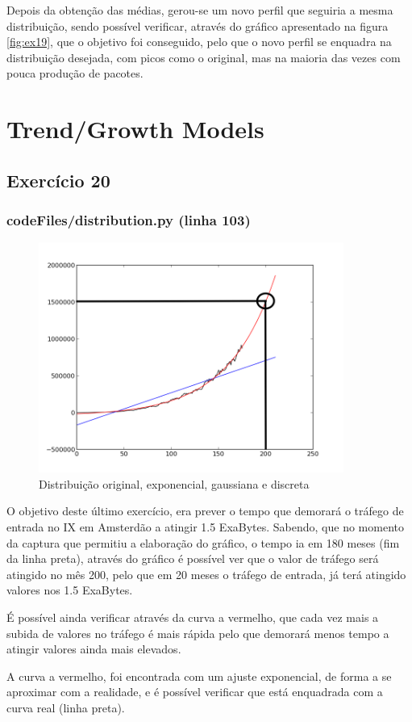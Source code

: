 \documentclass[pdftex,12pt,a4paper]{report}
\begin{document}
Depois da obtenção das médias, gerou-se um novo perfil que seguiria a mesma distribuição, sendo possível verificar, através do gráfico apresentado na figura \ref{fig:ex19}, que o objetivo foi conseguido, pelo que o novo perfil se enquadra na distribuição desejada, com picos como o original, mas na maioria das vezes com pouca produção de pacotes.

\newpage
\section{Trend/Growth Models}
\subsection{Exercício 20}
\subsubsection{codeFiles/distribution.py (linha 103)}

\begin{figure}[!htb]
\center
 \includegraphics[width=100mm,scale=1]{distribution/ex20.png}
 \caption{Distribuição original, exponencial, gaussiana e discreta}
 \label{fig:ex18}
\end{figure}

O objetivo deste último exercício, era prever o tempo que demorará o tráfego de entrada no IX em Amsterdão a atingir 1.5 ExaBytes.
Sabendo, que no momento da captura que permitiu a elaboração do gráfico, o tempo ia em 180 meses (fim da linha preta), através do gráfico é possível ver que o valor de tráfego será atingido no mês 200, pelo que em 20 meses o tráfego de entrada, já terá atingido valores nos 1.5 ExaBytes.

É possível ainda verificar através da curva a vermelho, que cada vez mais a subida de valores no tráfego é mais rápida pelo que demorará menos tempo a atingir valores ainda mais elevados.

A curva a vermelho, foi encontrada com um ajuste exponencial, de forma a se aproximar com a realidade, e é possível verificar que está enquadrada com a curva real (linha preta).
\end{document}
